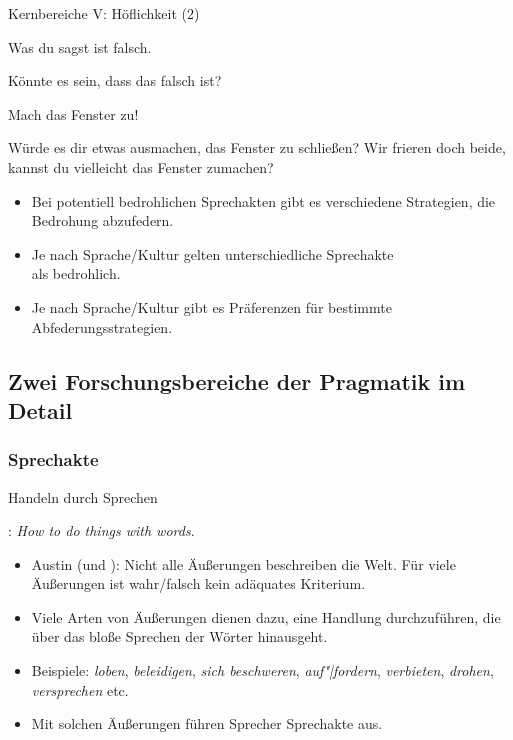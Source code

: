 \begin{frame}{Kernbereiche V: Höflichkeit (2)}

\begin{exe}
  \ex Was du sagst ist falsch.
  \begin{xlist}
   \ex \alert{Könnte} es sein, dass das falsch ist\alert{?}
  \end{xlist}
  \ex Mach das Fenster zu! 
  \begin{xlist}
    \ex \alert{Würde es dir etwas ausmachen}, das Fenster zu schließen\alert{?}
    \ex \alert{Wir frieren doch beide}, kannst du \alert{vielleicht} das Fenster zumachen\alert{?}
  \end{xlist}
\end{exe}


\begin{itemize}[<+->]
   \item Bei potentiell bedrohlichen Sprechakten gibt es verschiedene Strategien, die Bedrohung abzufedern.
   \item Je nach Sprache/Kultur gelten unterschiedliche Sprechakte\\ als bedrohlich.
   \item Je nach Sprache/Kultur gibt es Präferenzen für bestimmte Abfederungsstrategien. 
\end{itemize}

\end{frame}




\subsection{Zwei Forschungsbereiche der Pragmatik im Detail} 

\subsubsection{Sprechakte}


\begin{frame}{Handeln durch Sprechen}

\cite{Austin1962}: \textit{How to do things with words}.

\begin{itemize}[<+->]
\item Austin (und ): Nicht alle Äußerungen beschreiben die Welt. Für viele Äußerungen ist wahr/falsch kein adäquates Kriterium.
\item Viele Arten von Äußerungen dienen dazu, eine Handlung durchzuführen, die über das bloße Sprechen der Wörter hinausgeht.
\item Beispiele: \emph{loben}, \emph{beleidigen}, \emph{sich beschweren}, \emph{auf"|fordern}, \emph{verbieten}, \emph{drohen}, \emph{versprechen} etc.
\item Mit solchen Äußerungen führen Sprecher \alert{Sprechakte} aus.
\end{itemize}
\end{frame}




